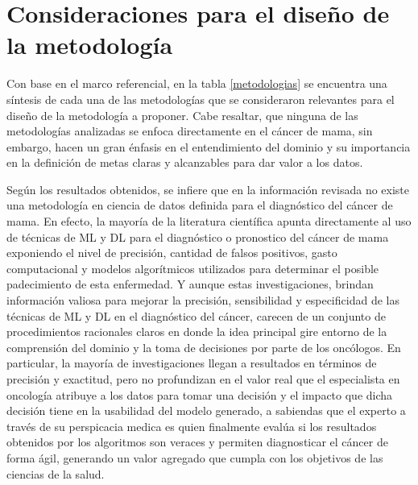 \chapter{Consideraciones para el diseño de la metodología}
Con base en el marco referencial, en la tabla \ref{metodologias} se encuentra una síntesis de cada una de las metodologías que se consideraron relevantes para el diseño de la metodología a proponer. Cabe resaltar, que ninguna de las metodologías analizadas se enfoca directamente en el cáncer de mama, sin embargo, hacen un gran énfasis en el entendimiento del dominio y su importancia en la definición de metas claras y alcanzables para dar valor a los datos. 

Según los resultados obtenidos, se infiere que en la información revisada no existe una metodología en ciencia de datos definida para el diagnóstico del cáncer de mama.  En efecto, la mayoría de la literatura científica apunta directamente al uso de técnicas de ML y DL para el diagnóstico o pronostico del cáncer de mama exponiendo el nivel de precisión, cantidad de falsos positivos, gasto computacional y modelos algorítmicos utilizados para determinar el posible padecimiento de esta enfermedad. Y aunque estas investigaciones, brindan información valiosa para mejorar la precisión, sensibilidad y especificidad de las técnicas de ML y DL en el diagnóstico del cáncer, carecen de un conjunto de procedimientos racionales claros en donde la idea principal gire entorno de la comprensión del dominio y la toma de decisiones por parte de los oncólogos. En particular, la mayoría de investigaciones llegan a resultados en términos de precisión y exactitud, pero no profundizan en el valor real que el especialista en oncología atribuye a los datos para tomar una decisión y el impacto que dicha decisión tiene en la usabilidad del modelo generado, a sabiendas que el experto a través de su perspicacia medica es quien finalmente evalúa si los resultados obtenidos por los algoritmos son veraces y permiten diagnosticar el cáncer de forma ágil, generando un valor agregado que cumpla con los objetivos de las ciencias de la salud. 

